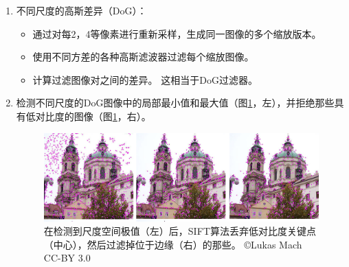 \begin{enumerate}
\item 不同尺度的高斯差异（DoG）：

\begin{itemize}

\item 通过对每2，4等像素进行重新采样，生成同一图像的多个缩放版本。
\item 使用不同方差的各种高斯滤波器过滤每个缩放图像。
\item 计算过滤图像对之间的差异。 这相当于DoG过滤器。
\end{itemize}


\item 检测不同尺度的DoG图像中的局部最小值和最大值（图\ref{fig:siftrejection}，左），并拒绝那些具有低对比度的图像（图\ref{fig:siftrejection}，右）。

\begin{figure}
	\centering
		\includegraphics[width=\textwidth]{figs/siftrejection.png}
	\caption{在检测到尺度空间极值（左）后，SIFT算法丢弃低对比度关键点（中心），然后过滤掉位于边缘（右）的那些。 \copyright Lukas Mach CC-BY 3.0}
	\label{fig:siftrejection}
\end{figure}


\end{enumerate}
